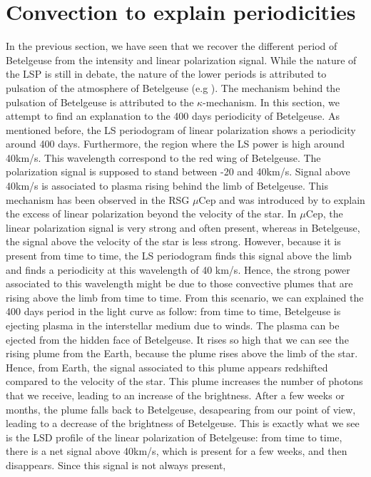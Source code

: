 \documentclass{aa}
\begin{document}
\section{Convection to explain periodicities}

In the previous section, we have seen that we recover the different period of Betelgeuse from the intensity and linear polarization signal. 
While the nature of the LSP is still in debate, the nature of the lower periods is attributed to pulsation of the atmosphere of Betelgeuse 
(e.g \cite{Kiss2006}). The mechanism behind the pulsation of Betelgeuse is attributed to the $\kappa$-mechanism. In this section, we attempt to 
find an explanation to the 400 days periodicity of Betelgeuse. As mentioned before, the LS periodogram of linear polarization shows a periodicity 
around 400 days. Furthermore, the region where the LS power is high around 40km/s. This wavelength correspond to the red wing of Betelgeuse.
The polarization signal is supposed to stand between -20 and 40km/s. Signal above 40km/s is associated to plasma rising behind the limb of Betelgeuse. 
This mechanism has been observed in the RSG $\mu$Cep and was introduced by \cite{LopezAriste2023} to explain the excess of linear polarization beyond 
the velocity of the star. In $\mu$Cep, the linear polarization signal is very strong and often present, whereas in Betelgeuse, the signal above the 
velocity of the star is less strong. However, because it is present from time to time, the LS periodogram finds this signal above the limb and finds a
periodicity at this wavelength of 40 km/s. Hence, the strong power associated to this wavelength might be due to those convective plumes that are 
rising above the limb from time to time. From this scenario, we can explained the 400 days period in the light curve as follow: from time to time,
Betelgeuse is ejecting plasma in the interstellar medium due to winds. The plasma can be ejected from the hidden face of Betelgeuse. 
It rises so high that we can see the rising plume from the Earth, because the plume rises above the limb of the star. Hence, from Earth, 
the signal associated to this plume appears redshifted compared to the velocity of the star. This plume increases the number of photons that we receive,
leading to an increase of the brightness. After a few weeks or months, the plume falls back to Betelgeuse, desapearing from our point of view, 
leading to a decrease of the brightness of Betelgeuse. This is exactly what we see is the LSD profile of the linear polarization of Betelgeuse: 
from time to time, there is a net signal above 40km/s, which is present for a few weeks, and then disappears. Since this signal is not always present, 
\end{document}
